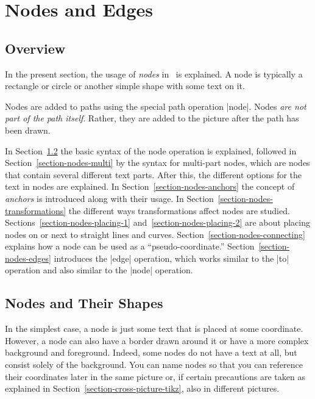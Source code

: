 %
%
%

\section{Nodes and Edges}

\label{section-nodes}

\subsection{Overview}

In the present section, the usage of \emph{nodes} in
\tikzname\ is explained. A node is typically a rectangle or circle or
another simple shape with some text on it.

Nodes are added to paths using the special path
operation |node|. Nodes \emph{are not part of the path
  itself}. Rather, they are added to the picture after the path has
been drawn.

In Section~\ref{section-nodes-basic} the basic syntax of the node
operation is explained, followed in Section~\ref{section-nodes-multi}
by the syntax for multi-part nodes, which are nodes that contain
several different text parts. After this, the different options for
the text in nodes are explained. In
Section~\ref{section-nodes-anchors} the concept of \emph{anchors} is
introduced along with their usage. In
Section~\ref{section-nodes-transformations} the different ways
transformations affect nodes are
studied. Sections~\ref{section-nodes-placing-1}
and~\ref{section-nodes-placing-2} are about placing nodes on or next
to straight lines and curves.
Section~\ref{section-nodes-connecting} explains how a node can
be used as a ``pseudo-coordinate.'' Section~\ref{section-nodes-edges}
introduces the |edge| operation, which
works similar to the |to| operation and also similar to the |node|
operation.


\subsection{Nodes and Their Shapes}

\label{section-nodes-basic}

In the simplest case, a node is just some text that is
placed at some coordinate. However, a node can also have a border
drawn around it or have a more complex background and
foreground. Indeed, some nodes do not have a text at all, but consist
solely of the background. You can name nodes so that you can reference
their coordinates later in the same picture or, if certain precautions
are taken as explained in Section~\ref{section-cross-picture-tikz},
also in different pictures.

